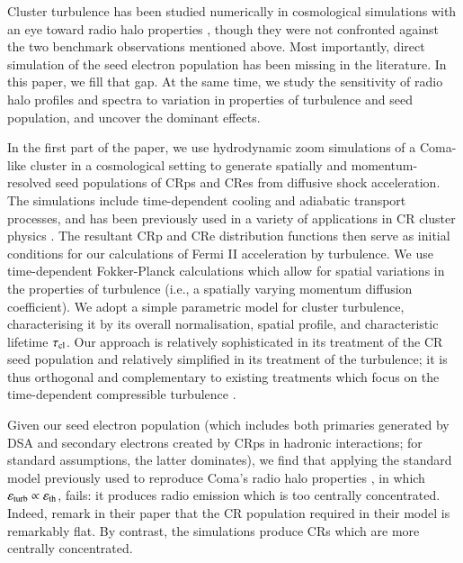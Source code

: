 \documentclass[fleqn,usenatbib,useAMS]{mnras}
\newcommand{\eps}{\varepsilon}
\begin{document}
Cluster turbulence has been studied numerically in cosmological simulations with
an eye toward radio halo properties \citep{2013ApJ...771..131B,
  miniati15}, though they were not confronted against the two
benchmark observations mentioned above. Most importantly, direct simulation of the
seed electron population has been missing in the literature. In this paper, we
fill that gap. At the same time, we study the sensitivity of radio halo profiles
and spectra to variation in properties of turbulence and seed population, and
uncover the dominant effects.

In the first part of the paper, we use hydrodynamic zoom simulations of a
Coma-like cluster in a cosmological setting to generate spatially and
momentum-resolved seed populations of CRps and CRes from diffusive shock
acceleration. The simulations include time-dependent cooling and adiabatic
transport processes, and has been previously used in a variety of applications
in CR cluster physics \citep{pinzke10,pinzke13}. The resultant CRp and CRe
distribution functions then serve as initial conditions for our calculations of
Fermi II acceleration by turbulence. We use time-dependent Fokker-Planck
calculations which allow for spatial variations in the properties of turbulence
(i.e., a spatially varying momentum diffusion coefficient). We adopt a simple
parametric model for cluster turbulence, characterising it by its overall
normalisation, spatial profile, and characteristic lifetime $\tau_{\rm cl}$. Our
approach is relatively sophisticated in its treatment of the CR seed population
and relatively simplified in its treatment of the turbulence; it is thus
orthogonal and complementary to existing treatments which focus on the
time-dependent compressible turbulence \citep{miniati15}.

Given our seed electron population (which includes both primaries generated by DSA and secondary electrons created by CRps in hadronic interactions; for standard assumptions, the latter dominates), we find that applying the standard model previously used to reproduce Coma's radio halo properties \citep{brunetti11}, in which $\eps_{\rm turb} \propto \eps_{\rm th}$, fails: it produces radio emission which is too centrally concentrated. Indeed, \citet{brunetti11} remark in their paper that the CR population required in their model is remarkably flat. By contrast, the simulations produce CRs which are more centrally concentrated.
\end{document}
